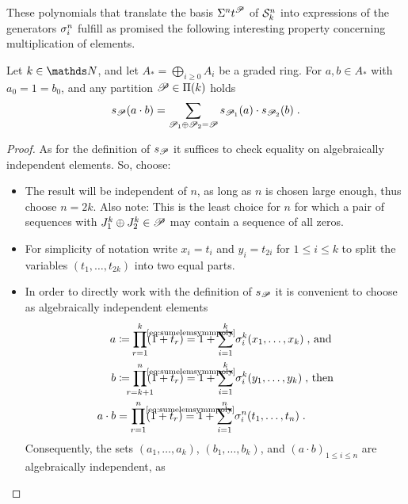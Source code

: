 These polynomials that translate the basis $\Sigma^{n}t^{\mathscr{P}}$ of
$\mathcal{S}^{n}_k$ into expressions of the generators $\sigma_{i}^{n}$
fulfill as promised the following interesting property concerning
multiplication of elements.
\begin{Lem}\label{lem:productrule:general}
  Let $k\in\Nat$, and let $A_*=\bigoplus_{i\geq 0} A_i$ be a graded ring.
  For $a,b\in A_*$ with $a_0=1=b_0$, and any partition
  $\mathscr{P}\in\Pi({k})$ holds
  \begin{gather*}
    s_{\mathscr{P}}(a\cdot b)
    = \sum_{\mathscr{P}_1\oplus\mathscr{P}_2=\mathscr{P}}
    s_{\mathscr{P}_1}(a) \cdot s_{\mathscr{P}_2}(b)
    \;.
  \end{gather*}
  \begin{proof}
    As for the definition of $s_{\mathscr{P}}$ it suffices to check equality
    on algebraically independent elements. So, choose:
    \begin{itemize}
    \item The result will be independent of $n$, as long as
      $n$ is chosen large enough, thus choose $n=2k$.
      Also note: This is the least choice for $n$ for which a pair
      of sequences with $J_1^k\oplus J_2^k\in\mathscr{P}$ may contain a
      sequence of all zeros.
    \item For simplicity of notation write
      $x_i=t_i$ and $y_i=t_{2i}$ for $1\leq i\leq k$ to split the
      variables $(t_1,\dotsc,t_{2k})$ into two equal parts.
    \item In order to directly work with the definition of $s_{\mathscr{P}}$ it is
      convenient to choose as algebraically independent elements
      \begin{align*}
        a &\coloneqq
            \prod_{\mathclap{r=1}}^k(1+t_r)
            \cequalsby{\eqref{eq:sumelemsymmpoly}}
            1 + \sum_{i=1}^k \el i k(x_1,\dotsc,x_k)
            \;\text{, and}\\
        b &\coloneqq
            \prod_{\mathclap{r=k+1}}^n(1+t_r)
            \cequalsby{\eqref{eq:sumelemsymmpoly}}
            1 + \sum_{i=1}^k \el i k(y_1,\dotsc,y_k)
            \;\text{, then}\\
        a\cdot b
          &=
            \prod_{r=1}^n (1+t_r)
            \cequalsby{\eqref{eq:sumelemsymmpoly}}
            1 + \sum_{i=1}^n \el i n (t_1,\dotsc,t_n)
            \;.
      \end{align*}
      Consequently, the sets 
      $(a_1,\dotsc,a_k)$, $(b_1,\dotsc,b_k)$, and
      $(a\cdot b)_{1\leq i\leq n}$ are algebraically independent, as

\end{itemize}
\end{proof}
\end{Lem}
